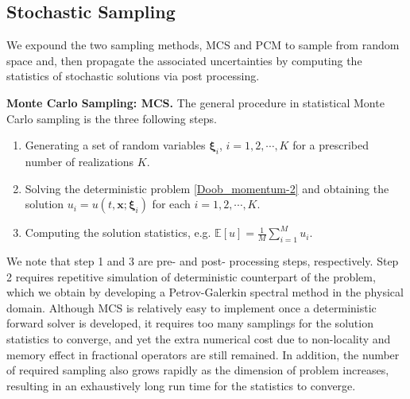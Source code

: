 %
\subsection{Stochastic Sampling}
\label{Sec: Stochastic Discretization}
%
We expound the two sampling methods, MCS and PCM to sample from random space and, then propagate the associated uncertainties by computing the statistics of stochastic solutions via post processing. 


\vspace{0.1 in}
\textbf{Monte Carlo Sampling: MCS.}
The general procedure in statistical Monte Carlo sampling is the three following steps.
%
\begin{enumerate}
	\item Generating a set of random variables $\boldsymbol{\xi}_i$, $i = 1,2 , \cdots,K$ for a prescribed number of realizations $K$.
	
	\item Solving the deterministic problem \eqref{Doob_momentum-2} and obtaining the solution $u_i = u(t,\textbf{x};\boldsymbol{\xi}_i)$ for each $i = 1,2 , \cdots,K$.
	
	\item Computing the solution statistics, e.g. $\mathbb{E}[u] = \frac{1}{M} \sum_{i=1}^{M} u_i$.
	
\end{enumerate}
%
We note that step 1 and 3 are pre- and post- processing steps, respectively. Step 2 requires repetitive simulation of deterministic counterpart of the problem, which we obtain by developing a Petrov-Galerkin spectral method in the physical domain. Although MCS is relatively easy to implement once a deterministic forward solver is developed, it requires too many samplings for the solution statistics to converge, and yet the extra numerical cost due to non-locality and memory effect in fractional operators are still remained. In addition, the number of required sampling also grows rapidly as the dimension of problem increases, resulting in an exhaustively long run time for the statistics to converge.
%


